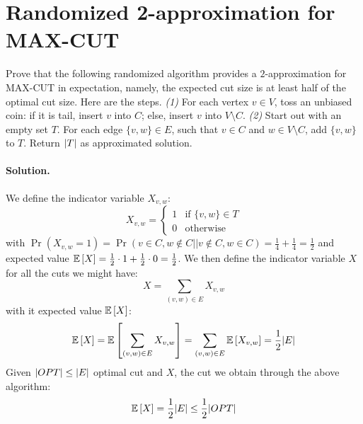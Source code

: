 \section{Randomized 2-approximation for MAX-CUT}

Prove  that  the  following  randomized algorithm provides a $2$-approximation for MAX-CUT in expectation, namely, the expected cut size is at least half of the optimal cut size.
Here are the steps.
\emph{(1)} For each vertex $v \in V$,  toss  an  unbiased  coin:  if  it  is  tail, insert $v$ into $C$; else, insert $v$ into $V \setminus C$.
\emph{(2)} Start out with an empty set $T$.
For each edge $\{v, w\} \in E$, such that $v \in C$ and $w \in V \setminus C$, add $\{v, w\}$ to $T$.
Return $\lvert T\rvert$ as approximated solution.

\vspace{0.5cm}
\paragraph{Solution.}
We define the indicator variable $X_{v, w}$:
\begin{equation*}
X_{v, w} =   \begin{cases}
            1   & \text{if } \{v, w\} \in T \\
            0   & \text{otherwise}
            \end{cases}
\end{equation*}
with $\Pr(X_{v, w} = 1) = \Pr(v \in C, w \notin C || v \notin C, w \in C) = \frac{1}{4} + \frac{1}{4} = \frac{1}{2}$ and expected value $\mathbb{E}\left[{X}\right] = \frac{1}{2} \cdot 1 + \frac{1}{2} \cdot 0 = \frac{1}{2}$.
We then define the indicator variable $X$ for all the cuts we might have:
\begin{equation*}
X = \sum_{(v, w) \in E} X_{v, w}
\end{equation*}
with it expected value $\mathbb{E}\left[{X}\right]$:
\begin{equation*}
\mathbb{E}\left[{X}\right] = \mathbb{E}\left[{\sum_{(v, w) \in E} X_{v, w}}\right] = \sum_{(v, w) \in E} \mathbb{E}\left[{X_{v, w}}\right] = \frac{1}{2} \lvert E\rvert
\end{equation*}
Given $\lvert OPT\rvert \leq \lvert E\rvert$ optimal cut and $X$, the cut we obtain through the above algorithm:
\begin{equation*}
\mathbb{E}\left[{X}\right] = \frac{1}{2} \lvert E\rvert \leq \frac{1}{2} \lvert OPT\rvert
\end{equation*}